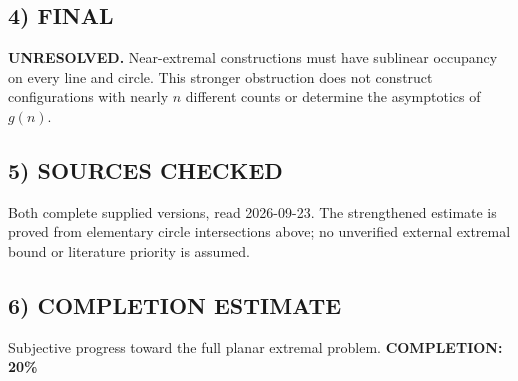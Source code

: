 \subsection*{4) FINAL}
\textbf{UNRESOLVED.} Near-extremal constructions must have sublinear occupancy on every line and circle. This stronger obstruction does not construct configurations with nearly $n$ different counts or determine the asymptotics of $g(n)$.
\subsection*{5) SOURCES CHECKED}
Both complete supplied versions, read 2026-09-23. The strengthened estimate is proved from elementary circle intersections above; no unverified external extremal bound or literature priority is assumed.
\subsection*{6) COMPLETION ESTIMATE}
Subjective progress toward the full planar extremal problem.
\textbf{COMPLETION: 20\%}
